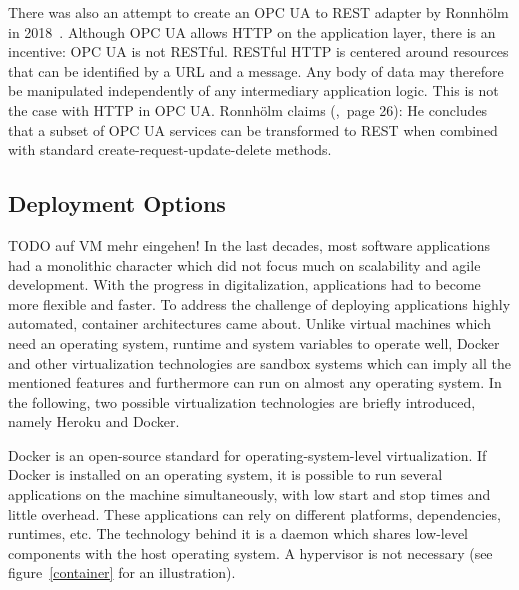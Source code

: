 There was also an attempt to create an OPC UA to REST adapter by Ronnhölm in 2018~\cite{Ronnholm2018IntegrationTranslator}. Although OPC UA allows HTTP on the application layer, there is an incentive: OPC UA is not RESTful. RESTful HTTP is centered around resources that can be identified by a URL and a message. Any body of data may therefore be manipulated independently of any intermediary application logic. This is not the case with HTTP in OPC UA. Ronnhölm claims (\cite{Ronnholm2018IntegrationTranslator},~page 26):  He concludes that a subset of OPC UA services can be transformed to REST when combined with standard create-request-update-delete methods.

\subsection {Deployment Options}
\label{deploymentoptions}
TODO auf VM mehr eingehen!
In the last decades, most software applications had a monolithic character which did not focus much on scalability and agile development. With the progress in digitalization, applications had to become more flexible and faster. To address the challenge of deploying applications highly automated, container architectures came about. Unlike virtual machines which need an operating system, runtime and system variables to operate well, Docker and other virtualization technologies are sandbox systems which can imply all the mentioned features and furthermore can run on almost any operating system. In the following, two possible virtualization technologies are briefly introduced, namely Heroku and Docker.~\cite{Wurbs2017Docker2018.}

Docker is an open-source standard for operating-system-level virtualization. If Docker is installed on an operating system, it is possible to run several applications on the machine simultaneously, with low start and stop times and little overhead. These applications can rely on different platforms, dependencies, runtimes, etc. The technology behind it is a daemon which shares low-level components with the host operating system. A hypervisor is not necessary (see figure~\ref{container} for an illustration). 

